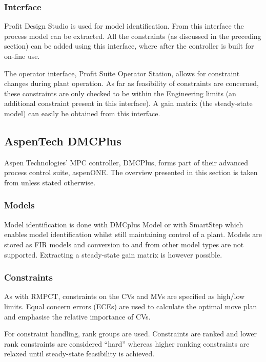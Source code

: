 \subsubsection{Interface}
Profit Design Studio is used for model identification.
From this interface the process model can be extracted.
All the constraints (as discussed in the preceding section) can be added using this interface, where after the controller is built for on-line use.

The operator interface, Profit Suite Operator Station, allows for constraint changes during plant operation.
As far as feasibility of constraints are concerned, these constraints are only checked to be within the Engineering limits (an additional constraint present in this interface).
A gain matrix (the steady-state model) can easily be obtained from this interface.


\subsection{AspenTech DMCPlus}
Aspen Technologies' MPC controller, DMCPlus, forms part of their advanced process control suite, aspenONE.
The overview presented in this section is taken from \citet{aspentech1} unless stated otherwise.

\subsubsection{Models}
Model identification is done with DMCplus Model or with SmartStep which enables model identification whilst still maintaining control of a plant.
Models are stored as FIR models and conversion to and from other model types are not supported.
Extracting a steady-state gain matrix is however possible.

\subsubsection{Constraints}
As with RMPCT, constraints on the CVs and MVs are specified as high/low limits.
Equal concern errors (ECEs) are used to calculate the optimal move plan and emphasise the relative importance of CVs.

For constraint handling, rank groups are used.
Constraints are ranked and lower rank constraints are considered ``hard'' whereas higher ranking constraints are relaxed until steady-state feasibility is achieved.

